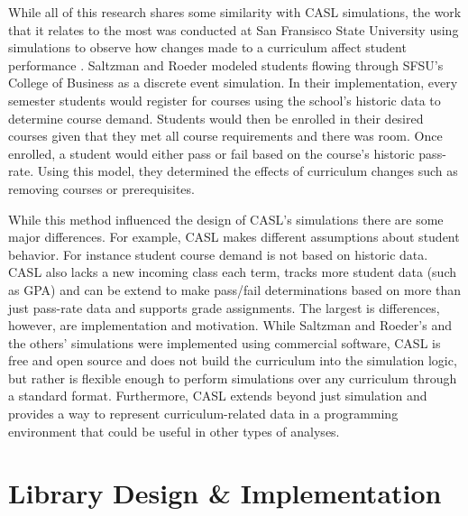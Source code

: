 \documentclass[botnum, fleqn]{unmeethesis}
\begin{document}
    While all of this research shares some similarity with CASL simulations, the work that it relates to the most was conducted at San Fransisco State University using simulations to observe how changes made to a curriculum affect student performance \cite{saltzman2012simulating}. Saltzman and Roeder modeled students flowing through SFSU's College of Business as a discrete event simulation. In their implementation, every semester students would register for courses using the school's historic data to determine course demand. Students would then be enrolled in their desired courses given that they met all course requirements and there was room. Once enrolled, a student would either pass or fail based on the course's historic pass-rate. Using this model, they determined the effects of curriculum changes such as removing courses or prerequisites. 

    While this method influenced the design of CASL's simulations there are some major differences. For example, CASL makes different assumptions about student behavior. For instance student course demand is not based on historic data. CASL also lacks a new incoming class each term, tracks more student data (such as GPA) and can be extend to make pass/fail determinations based on more than just pass-rate data and supports grade assignments. The largest is differences, however, are implementation and motivation. While Saltzman and Roeder's and the others' simulations were implemented using commercial software, CASL is free and open source and does not build the curriculum into the simulation logic, but rather is flexible enough to perform simulations over any curriculum through a standard format. Furthermore, CASL extends beyond just simulation and provides a way to represent curriculum-related data in a programming environment that could be useful in other types of analyses.

\chapter{Library Design \& Implementation}
\end{document}
